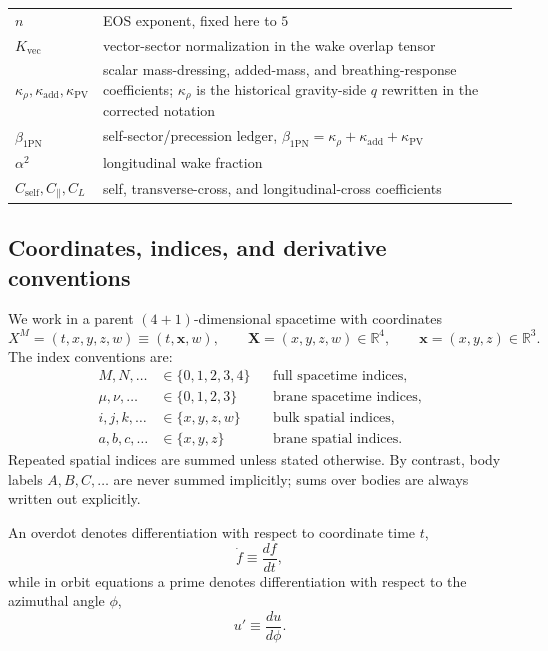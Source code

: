 \documentclass[11pt]{article}
\newcommand{\R}{\mathbb R}
\newcommand{\X}{\mathbf X}
\newcommand{\x}{\mathbf x}
\newcommand{\kadd}{\kappa_{\mathrm{add}}}
\newcommand{\kPV}{\kappa_{\mathrm{PV}}}
\newcommand{\krho}{\kappa_{\rho}}
\newcommand{\betaPN}{\beta_{\mathrm{1PN}}}
\newcommand{\Kvec}{K_{\mathrm{vec}}}
\newcommand{\alphaSq}{\alpha^2}
\newcommand{\Cself}{C_{\mathrm{self}}}
\newcommand{\Cpara}{C_{\parallel}}
\newcommand{\CLong}{C_{L}}
\begin{document}
\begin{table}[H]
\begin{tabularx}{\linewidth}{@{}L L@{}}
    \(n\) & EOS exponent, fixed here to \(5\) \\
    \(\Kvec\) & vector-sector normalization in the wake overlap tensor \\
    \(\krho,\kadd,\kPV\) & scalar mass-dressing, added-mass, and breathing-response coefficients; \(\krho\) is the historical gravity-side \(q\) rewritten in the corrected notation \\
    \(\betaPN\) & self-sector/precession ledger, \(\betaPN=\krho+\kadd+\kPV\) \\
    \(\alphaSq\) & longitudinal wake fraction \\
    \(\Cself,\Cpara,\CLong\) & self, transverse-cross, and longitudinal-cross coefficients \\
    \bottomrule
  \end{tabularx}
\end{table}

\subsection{Coordinates, indices, and derivative conventions}
\label{app:notation-indices}

We work in a parent \((4+1)\)-dimensional spacetime with coordinates
\begin{equation}
X^M=(t,x,y,z,w)\equiv (t,\x,w),
\qquad
\X=(x,y,z,w)\in\R^4,
\qquad
\x=(x,y,z)\in\R^3.
\label{eq:notation-coordinates}
\end{equation}
The index conventions are:
\begin{align}
M,N,\dots &\in \{0,1,2,3,4\}
&& \text{full spacetime indices}, \nonumber\\
\mu,\nu,\dots &\in \{0,1,2,3\}
&& \text{brane spacetime indices}, \nonumber\\
i,j,k,\dots &\in \{x,y,z,w\}
&& \text{bulk spatial indices}, \nonumber\\
a,b,c,\dots &\in \{x,y,z\}
&& \text{brane spatial indices}.
\label{eq:notation-index-ranges}
\end{align}
Repeated spatial indices are summed unless stated otherwise. By contrast, body labels
\(A,B,C,\dots\) are never summed implicitly; sums over bodies are always written out
explicitly.

An overdot denotes differentiation with respect to coordinate time \(t\),
\begin{equation}
\dot f \equiv \frac{df}{dt},
\end{equation}
while in orbit equations a prime denotes differentiation with respect to the azimuthal
angle \(\phi\),
\begin{equation}
u' \equiv \frac{du}{d\phi}.
\end{equation}
\end{document}
